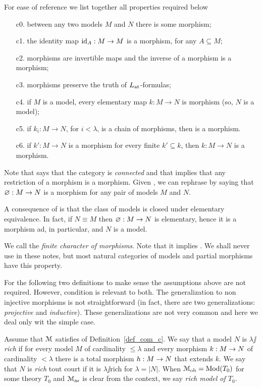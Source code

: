 \documentclass[creche.tex]{subfiles}
\begin{document}
\begin{definition}\label{def_com_c}For ease of reference we list together all properties required below
\begin{itemize} 
\item[c0.] between any two models $M$ and $N$ there is some morphism;
\item[c1.] the identity map $\textrm{id}_A:M\to M$ is a morphism, for any $A\subseteq M$;
\item[c2.] morphisms are invertible maps and the inverse of a morphism is a morphism;
\item[c3.] morphisms preserve the truth of $L_{\tiny\rm at}\hskip-.3ex$\,-formulas;
\item[c4.] if $M$ is a model, every elementary map $k:M\to N$ is morphism (so, $N$ is a model);
\item[c5.] if $k_i:M\to N$, for $i<\lambda$, is a chain of morphisms, then  is a morphism.
\item[c6.] if $k':M\to N$ is a morphism for every finite $k'\subseteq k$, then $k:M\to N$ is a morphism.\QED
\end{itemize}
\end{definition}
 
Note that  says that the category is \emph{connected} and that  implies that any restriction of a morphism is a morphism. Given , we can rephrase  by saying that $\varnothing:M\to N$ is a morphism for any pair of models $M$ and $N$. 

A consequence of  is that the class of models is closed under elementary equivalence. In fact, if $N\equiv M$ then $\varnothing:M\to N$ is elementary, hence it is a morphism ad, in particular, and $N$ is a model. 

We call  the \emph{finite character of morphisms}. Note that it implies . We shall never use  in these notes, but most natural categories of models and partial morphisms have this property.

For the following two definitions to make sense the assumptions above are not required. However, condition  is relevant to both. The generalization to non injective morphisms is not straightforward (in fact, there are two generalizations: \textit{projective\/} and \textit{inductive\/}). These generalizations are not very common and here we deal only wit the simple case. 

\begin{definition}
Assume that $\EuScript M$ satisfies  of Definition~\ref{def_com_c}. We say that a model $N$ is \emph{$\lambda\jj$rich\/} if for every model $M$ of cardinality $\le\lambda$ and every morphism $k:M\rightarrow N$ of cardinality $<\lambda$ there is a total morphism $h:M\rightarrow N$ that extends $k$. We say that $N$ is \emph{rich\/} tout court  if it is $\lambda\jj$rich for $\lambda=|N|$. When $\EuScript M_{\rm ob}=\mathop{\rm Mod}(T_0)$ for some theory $T_0$ and $\EuScript M_{\rm ar}$ is clear from the context, we say \emph{rich model of $T_0$}.\QED
\end{definition}
\end{document}
